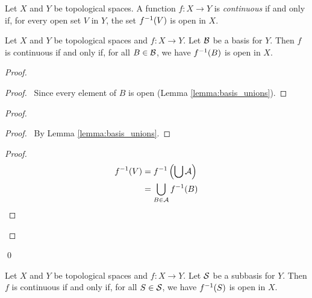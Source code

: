 \begin{definition}[Continuous]
    Let $X$ and $Y$ be topological spaces. A function $f : X \rightarrow Y$ is \emph{continuous} if and only
    if, for every open set $V$ in $Y$, the set ${f}^{-1}(V)$ is open in $X$.
\end{definition}

\begin{proposition}
    \label{proposition:continuous_basis}
    Let $X$ and $Y$ be topological spaces and $f : X \rightarrow Y$. Let $\mathcal{B}$ be a basis for $Y$. Then $f$
    is continuous if and only if, for all $B \in \mathcal{B}$, we have ${f}^{-1}(B)$ is open in $X$.
\end{proposition}

\begin{proof}
    \pf
    \begin{proof}
        \pf\ Since every element of $B$ is open (Lemma \ref{lemma:basis_unions}).
    \end{proof}
    \begin{proof}
        \begin{proof}
            \pf\ By Lemma \ref{lemma:basis_unions}.
        \end{proof}
        \begin{proof}
            \pf
            \begin{align*}
                {f}^{-1}(V) & = {f}^{-1} \left( \bigcup \mathcal{A} \right) \\
                & = \bigcup_{B \in \mathcal{A}} {f}^{-1}(B)
            \end{align*}
        \end{proof}
    \end{proof}
    \qed
\end{proof}

\begin{proposition}
    \label{proposition:continuous_subbasis}
    Let $X$ and $Y$ be topological spaces and $f : X \rightarrow Y$. Let $\mathcal{S}$ be a subbasis for $Y$. Then $f$
    is continuous if and only if, for all $S \in \mathcal{S}$, we have ${f}^{-1}(S)$ is open in $X$.
\end{proposition}

